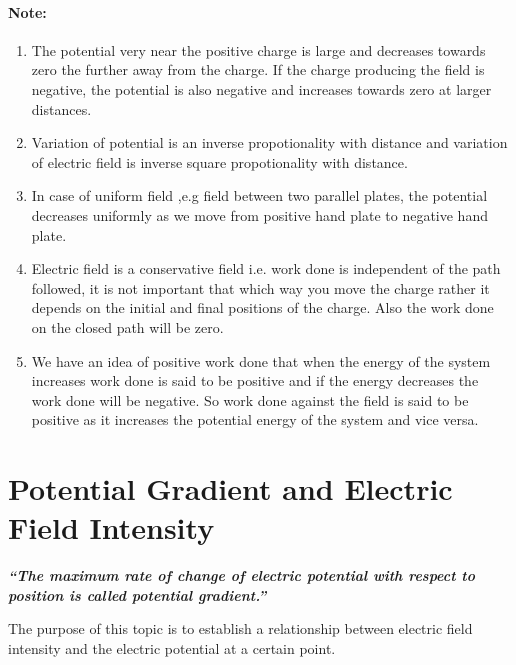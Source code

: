 \paragraph{Note:}
\begin{enumerate}[label = (\roman*)]
\item The potential very near the positive charge is large and decreases
towards zero the further away from the charge. If the charge producing the
field is negative, the potential is also negative and increases towards zero
at larger distances.
\item Variation of potential is an inverse propotionality with distance
and variation of electric field is inverse square propotionality with
distance.
\item In case of uniform field ,e.g field between two parallel plates,
the potential decreases uniformly as we move from positive hand plate
to negative hand plate.
\item Electric field is a conservative field i.e. work done is independent
of the path followed, it is not important that which way you move the
charge rather it depends on the initial and final positions of the charge.
Also the work done on the closed path will be zero.
\item We have an idea of positive work done that when the energy of the
system increases work done is said to be positive and if the energy
decreases the work done will be negative. So work done against the
field is said to be positive as it increases the potential energy
of the system and vice versa.
\end{enumerate}

\section{Potential Gradient and Electric Field Intensity}
\textit{\textbf{“The maximum rate of change of electric potential 
with respect to position is called potential gradient.”}}

The purpose of this topic is to establish a relationship between electric
field intensity and the electric potential at a certain point.

